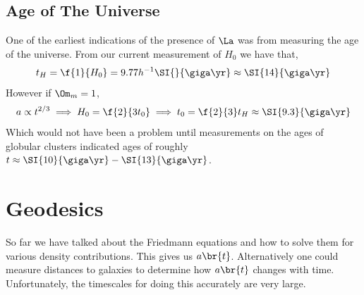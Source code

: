 \documentclass{article}
\begin{document}
\subsection{Age of The Universe}
One of the earliest indications of the presence of $\La$ was from measuring the age of the universe. From our current measurement of $H_0$ we have that,
\[ t_H = \f{1}{H_0} = 9.77 h^{-1} \SI{}{\giga \yr} \approx \SI{14}{\giga \yr} \]
However if $\Om_m = 1$,
\[ a \propto t^{2/3} \implies H_0 = \f{2}{3 t_0} \implies t_0 = \f{2}{3}t_H \approx \SI{9.3}{\giga \yr} \]
Which would not have been a problem until measurements on the ages of globular clusters indicated ages of roughly $t \approx \SI{10}{\giga \yr} - \SI{13}{\giga \yr}$.
\section{Geodesics}
So far we have talked about the Friedmann equations and how to solve them for various density contributions. This gives us $a\br{t}$. Alternatively one could measure distances to galaxies to determine how $a\br{t}$ changes with time. Unfortunately, the timescales for doing this accurately are very large. \\
\end{document}

